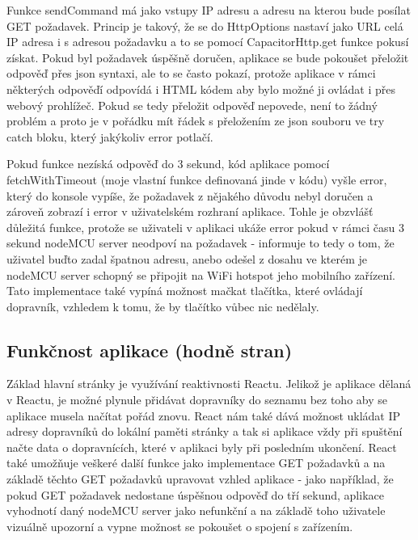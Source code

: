 Funkce sendCommand má jako vstupy IP adresu a adresu na kterou bude posílat GET požadavek. Princip je takový, že se do HttpOptions nastaví jako URL celá IP adresa i s adresou požadavku a to se pomocí CapacitorHttp.get funkce pokusí získat. Pokud byl požadavek úspěšně doručen, aplikace se bude pokoušet přeložit odpověď přes json syntaxi, ale to se často pokazí, protože aplikace v rámci některých odpověďí odpovídá i HTML kódem aby bylo možné ji ovládat i přes webový prohlížeč. Pokud se tedy přeložit odpověď nepovede, není to žádný problém a proto je v pořádku mít řádek s přeložením ze json souboru ve try catch bloku, který jakýkoliv error potlačí.

Pokud funkce nezíská odpověď do 3 sekund, kód aplikace pomocí fetchWithTimeout (moje vlastní funkce definovaná jinde v kódu) vyšle error, který do konsole vypíše, že požadavek z nějakého důvodu nebyl doručen a zároveň zobrazí i error v uživatelském rozhraní aplikace. Tohle je obzvlášť důležitá funkce, protože se uživateli v aplikaci ukáže error pokud v rámci času 3 sekund nodeMCU server neodpoví na požadavek - informuje to tedy o tom, že uživatel buďto zadal špatnou adresu, anebo odešel z dosahu ve kterém je nodeMCU server schopný se připojit na WiFi hotspot jeho mobilního zařízení. Tato implementace také vypíná možnost mačkat tlačítka, které ovládají dopravník, vzhledem k tomu, že by tlačítko vůbec nic nedělaly.

\subsection{Funkčnost aplikace (hodně stran)}

Základ hlavní stránky je využívání reaktivnosti Reactu. Jelikož je aplikace dělaná v Reactu, je možné plynule přidávat dopravníky do seznamu bez toho aby se aplikace musela načítat pořád znovu. React nám také dává možnost ukládat IP adresy dopravníků do lokální paměti stránky a tak si aplikace vždy při spuštění načte data o dopravnících, které v aplikaci byly při posledním ukončení. React také umožňuje veškeré další funkce jako implementace GET požadavků a na základě těchto GET požadavků upravovat vzhled aplikace - jako například, že pokud GET požadavek nedostane úspěšnou odpověď do tří sekund, aplikace vyhodnotí daný nodeMCU server jako nefunkční a na základě toho uživatele vizuálně upozorní a vypne možnost se pokoušet o spojení s zařízením.

